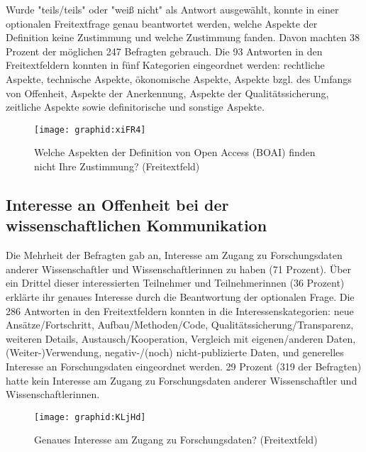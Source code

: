 Wurde "teils/teils" oder "weiß nicht" als Antwort ausgewählt, konnte in einer optionalen Freitextfrage genau beantwortet werden, welche Aspekte der Definition keine Zustimmung und welche Zustimmung fanden. Davon machten 38 Prozent der möglichen 247 Befragten gebrauch. Die 93 Antworten in den Freitextfeldern konnten in fünf Kategorien eingeordnet werden: rechtliche Aspekte, technische Aspekte, ökonomische Aspekte, Aspekte bzgl. des Umfangs von Offenheit, Aspekte der Anerkennung, Aspekte der Qualitätssicherung, zeitliche Aspekte sowie definitorische und sonstige Aspekte.

\begin{figure}[h!]
\texttt{[image: graphid:xiFR4]}
\caption{Welche Aspekten der Definition von Open Access (BOAI) finden nicht Ihre Zustimmung? (Freitextfeld)}
\end{figure}

\subsection{Interesse an Offenheit bei der wissenschaftlichen Kommunikation}

Die Mehrheit der Befragten gab an, Interesse am Zugang zu Forschungsdaten anderer Wissenschaftler und Wissenschaftlerinnen zu haben (71 Prozent). Über ein Drittel dieser interessierten Teilnehmer und Teilnehmerinnen (36 Prozent) erklärte ihr genaues Interesse durch die Beantwortung der optionalen Frage. Die 286 Antworten in den Freitextfeldern konnten in die Interessenskategorien: neue Ansätze/Fortschritt, Aufbau/Methoden/Code, Qualitätssicherung/Transparenz, weiteren Details, Austausch/Kooperation, Vergleich mit eigenen/anderen Daten, (Weiter-)Verwendung, negativ-/(noch) nicht-publizierte Daten, und generelles Interesse an Forschungsdaten eingeordnet werden. 29 Prozent (319 der Befragten) hatte kein Interesse am Zugang zu Forschungsdaten anderer Wissenschaftler und Wissenschaftlerinnen.

\begin{figure}[h!]
\texttt{[image: graphid:KLjHd]}
\caption{Genaues Interesse am Zugang zu Forschungsdaten? (Freitextfeld)}
\end{figure}

